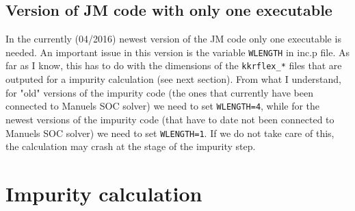 \documentclass[a4paper,10pt,fullpage]{report}
\begin{document}

\subsection{Version of JM code with only one executable}

In the currently (04/2016) newest version of the JM code only one executable is needed.
An important issue in this version is the variable \verb|WLENGTH| in inc.p
file. As far as I know, this has to do with the dimensions of the 
\verb|kkrflex_*| files that are outputed for a impurity calculation (see next section).
From what I understand, for "old" versions of the impurity code (the ones that currently
have been connected to Manuels SOC solver) we need to set \verb|WLENGTH=4|, 
while for the newest versions of the impurity code (that have to date not been connected to
Manuels SOC solver) we need to set  \verb|WLENGTH=1|. If we do not take care of this,
the calculation may crash at the stage of the impurity step.


\section{Impurity calculation}
\label{sec:impurity}
\end{document}
